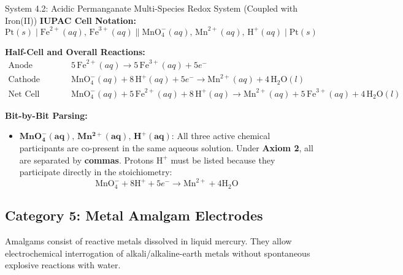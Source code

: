 \documentclass[10pt,a4paper]{article}
\begin{document}
\begin{examplebox}{System 4.2: Acidic Permanganate Multi-Species Redox System (Coupled with Iron(II))}
\textbf{IUPAC Cell Notation:}
\begin{equation*}
    \text{Pt}(s) \mid \text{Fe}^{2+}(aq),\, \text{Fe}^{3+}(aq) \parallel \text{MnO}_4^-(aq),\, \text{Mn}^{2+}(aq),\, \text{H}^+(aq) \mid \text{Pt}(s)
\end{equation*}

\textbf{Half-Cell and Overall Reactions:}
\begin{align*}
    \text{Anode (Oxidation):} \quad & 5\,\text{Fe}^{2+}(aq) \longrightarrow 5\,\text{Fe}^{3+}(aq) + 5e^- \\
    \text{Cathode (Reduction):} \quad & \text{MnO}_4^-(aq) + 8\,\text{H}^+(aq) + 5e^- \longrightarrow \text{Mn}^{2+}(aq) + 4\,\text{H}_2\text{O}(l) \\
    \text{Net Cell Reaction:} \quad & \text{MnO}_4^-(aq) + 5\,\text{Fe}^{2+}(aq) + 8\,\text{H}^+(aq) \longrightarrow \text{Mn}^{2+}(aq) + 5\,\text{Fe}^{3+}(aq) + 4\,\text{H}_2\text{O}(l)
\end{align*}

\textbf{Bit-by-Bit Parsing:}
\begin{itemize}[leftmargin=*]
    \item $\mathbf{MnO_4^-(aq),\, Mn^{2+}(aq),\, H^+(aq)}$: All three active chemical participants are co-present in the same aqueous solution. Under \textbf{Axiom 2}, all are separated by \textbf{commas}. Protons $\text{H}^+$ must be listed because they participate directly in the stoichiometry:
    \begin{equation*}
        \text{MnO}_4^- + 8\text{H}^+ + 5e^- \longrightarrow \text{Mn}^{2+} + 4\text{H}_2\text{O}
    \end{equation*}
\end{itemize}
\end{examplebox}

\subsection{Category 5: Metal Amalgam Electrodes}
Amalgams consist of reactive metals dissolved in liquid mercury. They allow electrochemical interrogation of alkali/alkaline-earth metals without spontaneous explosive reactions with water.
\end{document}
